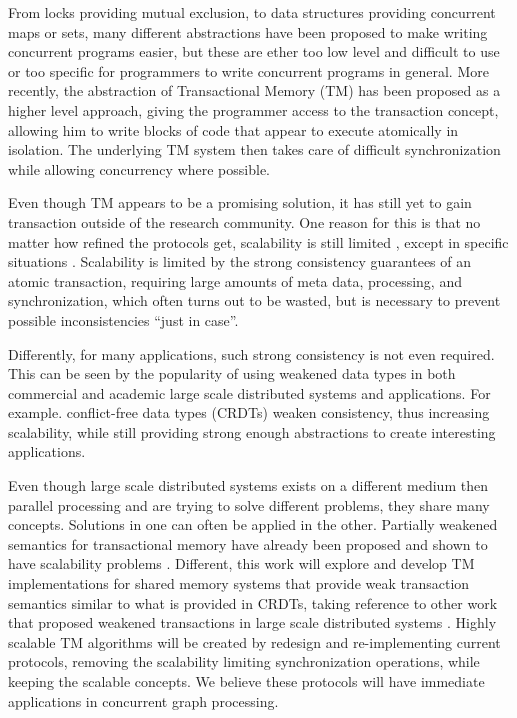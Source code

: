 \documentclass[11pt,letterpaper]{article}
\begin{document}
From locks providing mutual exclusion, to data structures providing concurrent maps or sets,
many different abstractions have been proposed to make writing concurrent programs easier,
but these are ether too low level and difficult to use or too specific for programmers
to write concurrent programs in general.
More recently, the abstraction of Transactional Memory (TM) \cite{HM93,ST97} has been proposed as a higher level approach,
giving the programmer access to the transaction concept, allowing him to write blocks
of code that appear to execute atomically in isolation.
The underlying TM system then takes care of difficult
synchronization while allowing concurrency where possible.

Even though TM appears to be a promising solution, it has
still yet to gain transaction outside of the research community.
One reason for this is that no matter how refined the protocols get,
scalability is still limited \cite{CBMCWC08}, except in specific situations \cite{DFGG11}.
Scalability is limited by the strong consistency guarantees of an atomic transaction, requiring large
amounts of meta data, processing, and synchronization, which often
turns out to be wasted, but is necessary to prevent possible inconsistencies
``just in case''.

Differently, for many applications, such strong consistency is not even required.
This can be seen by the popularity of using weakened data types in
both commercial and academic large scale distributed systems and applications.
For example. conflict-free data types (CRDTs) \cite{SPBZ11}
weaken consistency, thus increasing scalability,
while still providing strong enough abstractions
to create interesting applications.

Even though large scale distributed systems exists on a different medium then parallel processing
and are trying to solve different problems,
they share many concepts.
Solutions in one can often be applied in the other.
Partially weakened semantics for transactional memory have already been proposed
and shown to have scalability problems \cite{BDFG13}.
Different, this work will explore and develop TM implementations for shared memory systems that provide
weak transaction semantics similar to what is provided in CRDTs,
taking reference to other work that proposed weakened
transactions in large scale distributed systems \cite{ZBBDBSP13}.
Highly scalable TM algorithms
will be created by redesign and re-implementing current protocols, removing
the scalability limiting synchronization operations, while keeping the scalable concepts.
We believe these protocols will have immediate applications in concurrent graph processing.
\end{document}
